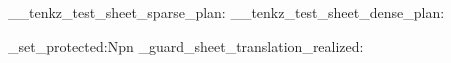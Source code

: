 \documentclass{standalone}
\begin{document}
\tenkzkernel
\ExplSyntaxOn
\__tenkz_test_sheet_sparse_plan:
\__tenkz_test_sheet_dense_plan:
\ExplSyntaxOff

{
\ExplSyntaxOn
\cs_set_protected:Npn \tenkzl_guard_sheet_translation_realized:
  {  }
\ExplSyntaxOff
\begin{tenkzlattice}[
    rows=1, cols=1, sheets=2, frame=flat, sheet sep=0.5]
\end{tenkzlattice}
}
\end{document}
